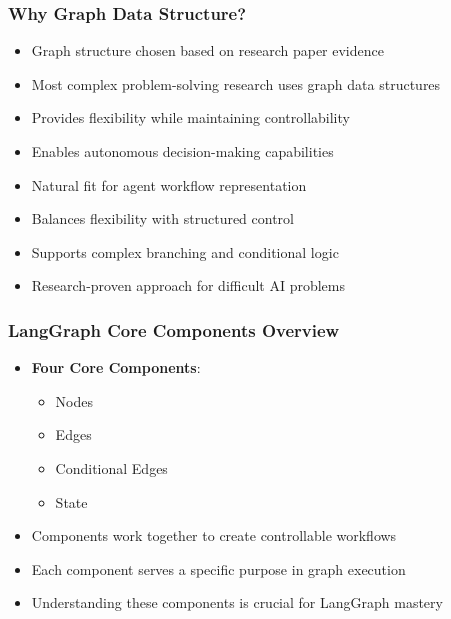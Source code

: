 \begin{frame}[fragile]\frametitle{Why Graph Data Structure?}
      \begin{itemize}
        \item Graph structure chosen based on research paper evidence
        \item Most complex problem-solving research uses graph data structures
        \item Provides flexibility while maintaining controllability
        \item Enables autonomous decision-making capabilities
        \item Natural fit for agent workflow representation
        \item Balances flexibility with structured control
        \item Supports complex branching and conditional logic
        \item Research-proven approach for difficult AI problems
      \end{itemize}
\end{frame}

\begin{frame}[fragile]\frametitle{LangGraph Core Components Overview}
      \begin{itemize}
        \item \textbf{Four Core Components}:
        \begin{itemize}
            \item Nodes
            \item Edges  
            \item Conditional Edges
            \item State
        \end{itemize}
        \item Components work together to create controllable workflows
        \item Each component serves a specific purpose in graph execution
        \item Understanding these components is crucial for LangGraph mastery
      \end{itemize}
\end{frame}

